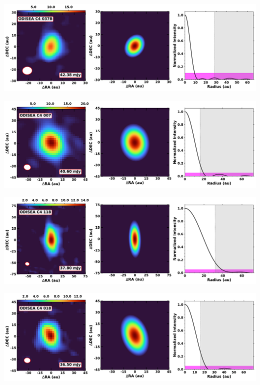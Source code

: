 \vspace{0pt}
\begin{minipage}{.49\textwidth}
	 \centering
	 	 \hrulesep
	 	 \includegraphics[width=1\linewidth]{pdf/0+II/049_odisea_c4_037b_cutout.pdf}
\end{minipage}%
\vrulesep
\begin{minipage}{.49\textwidth}
	 \centering
	 	 \hrulesep
	 	 \includegraphics[width=1\linewidth]{pdf/0+II/047_odisea_c4_007_cutout.pdf}
\end{minipage}%
\vspace{0pt}
\begin{minipage}{.49\textwidth}
	 \centering
	 	 \hrulesep
	 	 \includegraphics[width=1\linewidth]{pdf/0+II/045_odisea_c4_118_cutout.pdf}
\end{minipage}%
\vrulesep
\begin{minipage}{.49\textwidth}
	 \centering
	 	 \hrulesep
	 	 \includegraphics[width=1\linewidth]{pdf/0+II/043_odisea_c4_018_cutout.pdf}
\end{minipage}%
